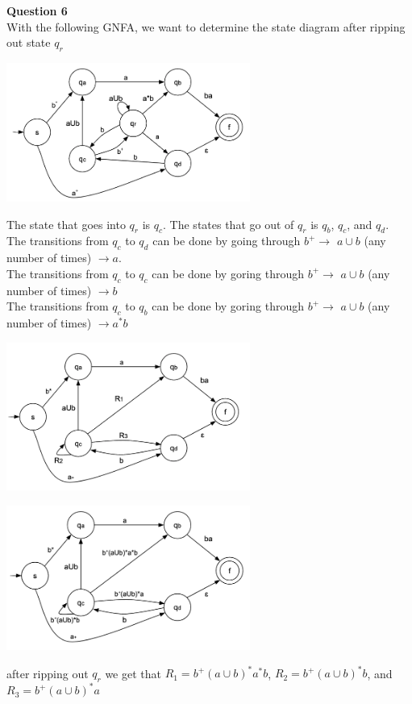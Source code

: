 \documentclass{article}
\begin{document}
{\bf Question 6}\\
With the following GNFA, we want to determine the state diagram after ripping out state $q_r$
\begin{center}
    \includegraphics[width=0.6\textwidth]{6-1.png}
\end{center}
The state that goes into $q_r$ is $q_c$. The states that go out of $q_r$ is $q_b$, $q_c$, and $q_d$.\\
The transitions from $q_c$ to $q_d$ can be done by going through $b^+ \rightarrow$ $a \cup b$ (any number of times) $\rightarrow a$.\\
The transitions from $q_c$ to $q_c$ can be done by goring through $b^+ \rightarrow$ $a \cup b$ (any number of times) $\rightarrow b$\\
The transitions from $q_c$ to $q_b$ can be done by goring through $b^+ \rightarrow$ $a \cup b$ (any number of times) $\rightarrow a^*b$\\
\begin{center}
    \includegraphics[width=0.6\textwidth]{6.png}
\end{center}
\begin{center}
    \includegraphics[width=0.6\textwidth]{6-2.png}
\end{center}
after ripping out $q_r$ we get that $R_1=b^+(a \cup b)^*a^*b$, $R_2= b^+(a \cup b)^*b$, and $R_3=b^+(a \cup b)^*a$
\end{document}
